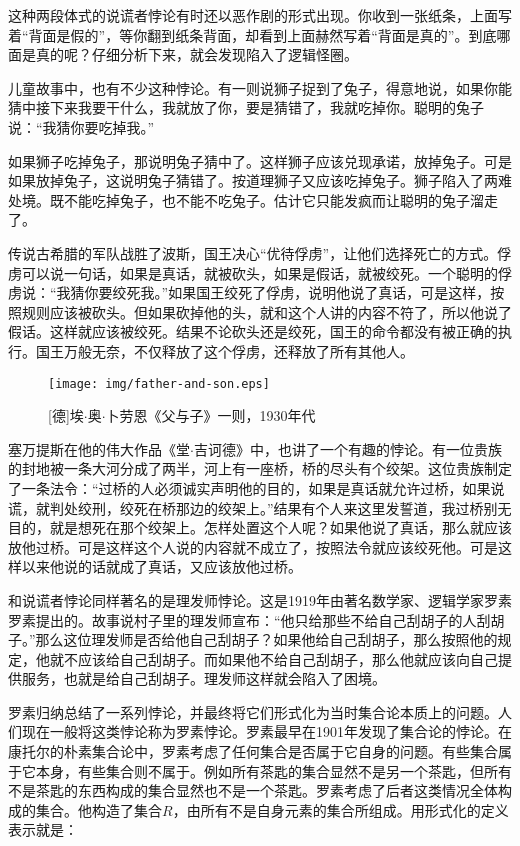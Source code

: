 \documentclass{article}
\begin{document}
这种两段体式的说谎者悖论有时还以恶作剧的形式出现。你收到一张纸条，上面写着“背面是假的”，等你翻到纸条背面，却看到上面赫然写着“背面是真的”。到底哪面是真的呢？仔细分析下来，就会发现陷入了逻辑怪圈。

儿童故事中，也有不少这种悖论。有一则说狮子捉到了兔子，得意地说，如果你能猜中接下来我要干什么，我就放了你，要是猜错了，我就吃掉你。聪明的兔子说：“我猜你要吃掉我。”

如果狮子吃掉兔子，那说明兔子猜中了。这样狮子应该兑现承诺，放掉兔子。可是如果放掉兔子，这说明兔子猜错了。按道理狮子又应该吃掉兔子。狮子陷入了两难处境。既不能吃掉兔子，也不能不吃兔子。估计它只能发疯而让聪明的兔子溜走了。

传说古希腊的军队战胜了波斯，国王决心“优待俘虏”，让他们选择死亡的方式。俘虏可以说一句话，如果是真话，就被砍头，如果是假话，就被绞死。一个聪明的俘虏说：“我猜你要绞死我。”如果国王绞死了俘虏，说明他说了真话，可是这样，按照规则应该被砍头。但如果砍掉他的头，就和这个人讲的内容不符了，所以他说了假话。这样就应该被绞死。结果不论砍头还是绞死，国王的命令都没有被正确的执行。国王万般无奈，不仅释放了这个俘虏，还释放了所有其他人。

\begin{wrapfigure}{L}{0.5\textwidth}
 \centering
 \texttt{[image: img/father-and-son.eps]}
 \captionsetup{labelformat=empty}
 \caption{[德]埃$\cdot$奥$\cdot$卜劳恩《父与子》一则，1930年代}
 \label{fig:father-and-son}
\end{wrapfigure}

塞万提斯在他的伟大作品《堂$\cdot$吉诃德》中，也讲了一个有趣的悖论。有一位贵族的封地被一条大河分成了两半，河上有一座桥，桥的尽头有个绞架。这位贵族制定了一条法令：“过桥的人必须诚实声明他的目的，如果是真话就允许过桥，如果说谎，就判处绞刑，绞死在桥那边的绞架上。”结果有个人来这里发誓道，我过桥别无目的，就是想死在那个绞架上。怎样处置这个人呢？如果他说了真话，那么就应该放他过桥。可是这样这个人说的内容就不成立了，按照法令就应该绞死他。可是这样以来他说的话就成了真话，又应该放他过桥。

和说谎者悖论同样著名的是理发师悖论。这是1919年由著名数学家、逻辑学家罗素罗素提出的。故事说村子里的理发师宣布：“他只给那些不给自己刮胡子的人刮胡子。”那么这位理发师是否给他自己刮胡子？如果他给自己刮胡子，那么按照他的规定，他就不应该给自己刮胡子。而如果他不给自己刮胡子，那么他就应该向自己提供服务，也就是给自己刮胡子。理发师这样就会陷入了困境。

罗素归纳总结了一系列悖论，并最终将它们形式化为当时集合论本质上的问题。人们现在一般将这类悖论称为罗素悖论。罗素最早在1901年发现了集合论的悖论。在康托尔的朴素集合论中，罗素考虑了任何集合是否属于它自身的问题。有些集合属于它本身，有些集合则不属于。例如所有茶匙的集合显然不是另一个茶匙，但所有不是茶匙的东西构成的集合显然也不是一个茶匙。罗素考虑了后者这类情况全体构成的集合。他构造了集合$R$，由所有不是自身元素的集合所组成。用形式化的定义表示就是：
\end{document}
